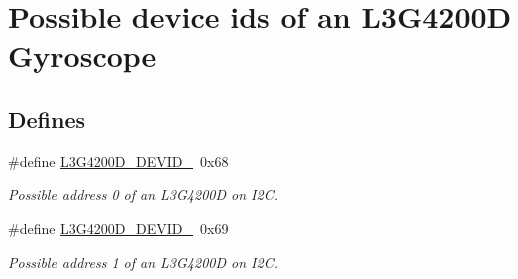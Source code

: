 \hypertarget{group___l3_g4200_d___d_e_v_i_c_e___i_d_s}{\section{\-Possible device ids of an \-L3\-G4200\-D \-Gyroscope}
\label{group___l3_g4200_d___d_e_v_i_c_e___i_d_s}
}
\subsection*{\-Defines}
\begin{DoxyCompactItemize}
\item 
\hypertarget{group___l3_g4200_d___d_e_v_i_c_e___i_d_s_gac0a640df1322f5f945eb8c1daff2980e}{\#define \hyperlink{group___l3_g4200_d___d_e_v_i_c_e___i_d_s_gac0a640df1322f5f945eb8c1daff2980e}{\-L3\-G4200\-D\-\_\-\-D\-E\-V\-I\-D\-\_}~0x68}\label{group___l3_g4200_d___d_e_v_i_c_e___i_d_s_gac0a640df1322f5f945eb8c1daff2980e}

\begin{DoxyCompactList}\small\item\em \-Possible address 0 of an \-L3\-G4200\-D on \-I2\-C. \end{DoxyCompactList}\item 
\hypertarget{group___l3_g4200_d___d_e_v_i_c_e___i_d_s_gacc4da7e364e8f20599ce14fb73521c9b}{\#define \hyperlink{group___l3_g4200_d___d_e_v_i_c_e___i_d_s_gacc4da7e364e8f20599ce14fb73521c9b}{\-L3\-G4200\-D\-\_\-\-D\-E\-V\-I\-D\-\_}~0x69}\label{group___l3_g4200_d___d_e_v_i_c_e___i_d_s_gacc4da7e364e8f20599ce14fb73521c9b}

\begin{DoxyCompactList}\small\item\em \-Possible address 1 of an \-L3\-G4200\-D on \-I2\-C. \end{DoxyCompactList}\end{DoxyCompactItemize}
